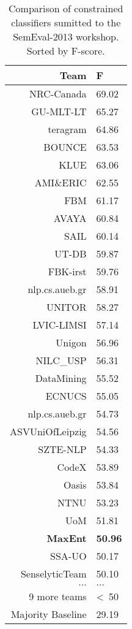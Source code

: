 \documentclass[final,3p,12pt]{elsarticle}
\begin{document}
\begin{table}[H]
    \begin{center}
    \begin{tabular}{|r|l|}
        \hline
        Team       & F \\
        \hline
        NRC-Canada & 69.02 \\
        GU-MLT-LT  & 65.27 \\
        teragram   & 64.86 \\
        BOUNCE     & 63.53 \\
        KLUE       & 63.06 \\
        AMI\&ERIC  & 62.55 \\
        FBM        & 61.17 \\
        AVAYA      & 60.84 \\
        SAIL       & 60.14 \\
        UT-DB      & 59.87 \\
        FBK-irst   & 59.76 \\
        nlp.cs.aueb.gr & 58.91 \\
        UNITOR     & 58.27 \\
        LVIC-LIMSI & 57.14 \\
        Unigon     & 56.96 \\
        NILC\_USP  & 56.31 \\
        DataMining & 55.52 \\
        ECNUCS     & 55.05 \\
        nlp.cs.aueb.gr & 54.73 \\
        ASVUniOfLeipzig & 54.56 \\
        SZTE-NLP   & 54.33 \\
        CodeX      & 53.89 \\
        Oasis      & 53.84 \\
        NTNU       & 53.23 \\
        UoM        & 51.81 \\
        \textbf{MaxEnt}& \textbf{50.96} \\
        SSA-UO     & 50.17 \\
        SenselyticTeam & 50.10 \\
        $\ldots$   & $\ldots$ \\
        9 more teams &  \textless\ 50 \\
        \hline
        Majority Baseline & 29.19 \\
        \hline
    \end{tabular}
    \end{center}
    \caption{Comparison of constrained classifiers sumitted to the SemEval-2013
        workshop. Sorted by F-score.}
    \label{table:comparison}
\end{table}
\end{document}
